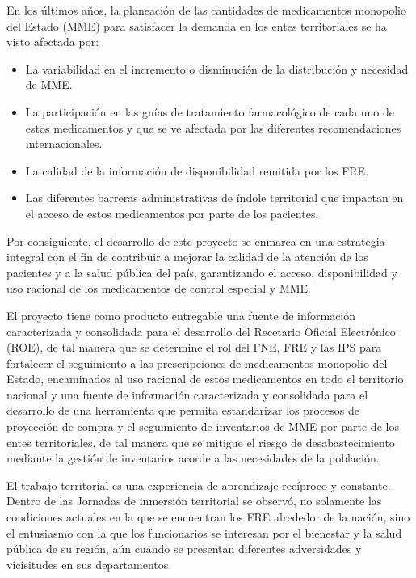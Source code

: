 \documentclass[
]{book}
\begin{document}
En los últimos años, la planeación de las cantidades de medicamentos monopolio del Estado (MME) para satisfacer la demanda en los entes territoriales se ha visto afectada por:

\begin{itemize}
\item
  La variabilidad en el incremento o disminución de la distribución y necesidad de MME.
\item
  La participación en las guías de tratamiento farmacológico de cada uno de estos medicamentos y que se ve afectada por las diferentes recomendaciones internacionales.
\item
  La calidad de la información de disponibilidad remitida por los FRE.
\item
  Las diferentes barreras administrativas de índole territorial que impactan en el acceso de estos medicamentos por parte de los pacientes.
\end{itemize}

Por consiguiente, el desarrollo de este proyecto se enmarca en una estrategia integral con el fin de contribuir a mejorar la calidad de la atención de los pacientes y a la salud pública del país, garantizando el acceso, disponibilidad y uso racional de los medicamentos de control especial y MME.

El proyecto tiene como producto entregable una fuente de información caracterizada y consolidada para el desarrollo del Recetario Oficial Electrónico (ROE), de tal manera que se determine el rol del FNE, FRE y las IPS para fortalecer el seguimiento a las prescripciones de medicamentos monopolio del Estado, encaminados al uso racional de estos medicamentos en todo el territorio nacional y una fuente de información caracterizada y consolidada para el desarrollo de una herramienta que permita estandarizar los procesos de proyección de compra y el seguimiento de inventarios de MME por parte de los entes territoriales, de tal manera que se mitigue el riesgo de desabastecimiento mediante la gestión de inventarios acorde a las necesidades de la población.

El trabajo territorial es una experiencia de aprendizaje recíproco y constante. Dentro de las Jornadas de inmersión territorial se observó, no solamente las condiciones actuales en la que se encuentran los FRE alrededor de la nación, sino el entusiasmo con la que los funcionarios se interesan por el bienestar y la salud pública de su región, aún cuando se presentan diferentes adversidades y vicisitudes en sus departamentos.
\end{document}
